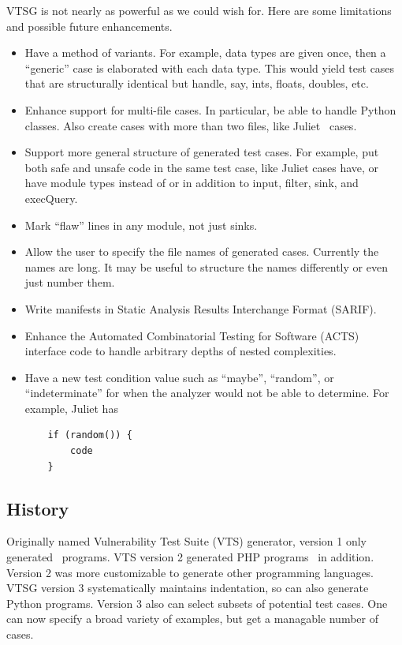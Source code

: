 VTSG is not nearly as powerful as we could wish for.  Here are some limitations and
possible future enhancements.
\begin{itemize}
  \item Have a method of variants.  For example, data types are given once, then a
    ``generic'' case is elaborated with each data type.  This would yield test cases
    that are structurally identical but handle, say, ints, floats, doubles, etc.
  \item Enhance support for multi-file cases.  In particular, be able to handle
    Python classes.  Also create cases with more than two files, like
    Juliet~\cite{Black2018Juliet1.3changes} cases.
  \item Support more general structure of generated test cases.  For example, put both
    safe and unsafe code in the same test case, like Juliet cases have, or have
    module types instead of or in addition to input, filter, sink, and execQuery.
  \item Mark ``flaw'' lines in any module, not just sinks.
  \item Allow the user to specify the file names of generated cases.  Currently the
    names are long.  It may be useful to structure the names differently or
    even just number them.
  \item Write manifests in Static Analysis Results Interchange Format (SARIF).
  \item Enhance the Automated Combinatorial Testing for Software (ACTS) interface
    code to handle arbitrary depths of nested
    complexities.
  \item Have a new test condition value such as ``maybe'', ``random'', or
    ``indeterminate'' for when the analyzer would not be able to determine.  For
    example, Juliet has
    \begin{verbatim}
    if (random()) {
        code
    }
    \end{verbatim}
\end{itemize}


\subsection{History}

Originally named Vulnerability Test Suite (VTS) generator, version 1 only
generated \CSharp\ programs. VTS version 2 generated PHP
programs~\cite{StivaletFongVTSPHP2016} in addition.  Version 2 was more
customizable to generate other programming languages.
VTSG version 3 systematically maintains indentation, so can also generate Python
programs.
Version 3 also can select subsets of potential test cases.  One can now specify a
broad variety of examples, but get a managable number of cases.

